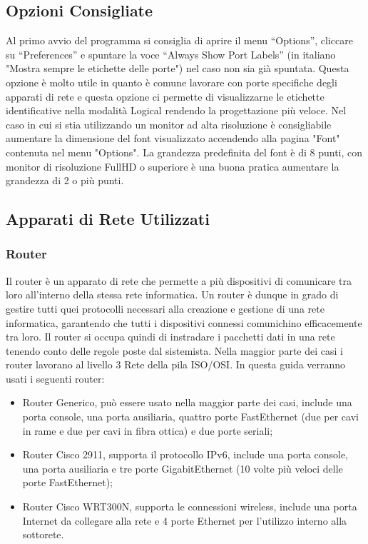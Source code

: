 \subsection{Opzioni Consigliate}
Al primo avvio del programma si consiglia di aprire il menu “Options”, cliccare su “Preferences” e spuntare la voce “Always Show Port Labels” (in italiano "Mostra sempre le etichette delle porte") nel caso non sia già spuntata. Questa opzione è molto utile in quanto è comune lavorare con porte specifiche degli apparati di rete e questa opzione ci permette di visualizzarne le etichette identificative nella modalità Logical rendendo la progettazione più veloce. \newline
\smallskip
\newline
Nel caso in cui si stia utilizzando un monitor ad alta risoluzione è consigliabile aumentare la dimensione del font visualizzato accendendo alla pagina "Font" contenuta nel menu "Options". La grandezza predefinita del font è di 8 punti, con monitor di risoluzione FullHD o superiore è una buona pratica aumentare la grandezza di 2 o più punti.

\subsection{Apparati di Rete Utilizzati}

\subsubsection{Router}
Il router è un apparato di rete che permette a più dispositivi di comunicare tra loro all'interno della stessa rete informatica. Un router è dunque in grado di gestire tutti quei protocolli necessari alla creazione e gestione di una rete informatica, garantendo che tutti i dispositivi connessi comunichino efficacemente tra loro. Il router si occupa quindi di instradare i pacchetti dati in una rete tenendo conto delle regole poste dal sistemista. Nella maggior parte dei casi i router lavorano al livello 3 Rete della pila ISO/OSI. \newline
\smallskip
\newline
In questa guida verranno usati i seguenti router:

\begin{itemize}
    \item Router Generico, può essere usato nella maggior parte dei casi, include una porta console, una porta ausiliaria, quattro porte FastEthernet (due per cavi in rame e due per cavi in fibra ottica) e due porte seriali;
    \item Router Cisco 2911, supporta il protocollo IPv6, include una porta console, una porta ausiliaria e tre porte GigabitEthernet (10 volte più veloci delle porte FastEthernet);
    \item Router Cisco WRT300N, supporta le connessioni wireless, include una porta Internet da collegare alla rete e 4 porte Ethernet per l'utilizzo interno alla sottorete.
\end{itemize}

